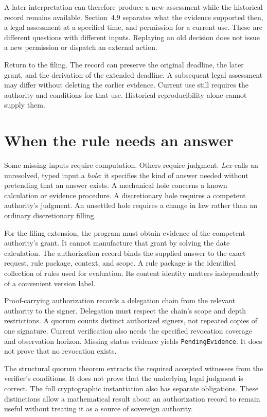 \documentclass{momentum}
\begin{document}
A later interpretation can therefore produce a new assessment while the historical record remains available. Section~4.9 separates what the evidence supported then, a legal assessment at a specified time, and permission for a current use. These are different questions with different inputs. Replaying an old decision does not issue a new permission or dispatch an external action.

Return to the filing. The record can preserve the original deadline, the later grant, and the derivation of the extended deadline. A subsequent legal assessment may differ without deleting the earlier evidence. Current use still requires the authority and conditions for that use. Historical reproducibility alone cannot supply them. \cite[Sections~3.3, 4.9, and~7.7]{lex}

\section{When the rule needs an answer}

Some missing inputs require computation. Others require judgment. \emph{Lex} calls an unresolved, typed input a \emph{hole}: it specifies the kind of answer needed without pretending that an answer exists. A mechanical hole concerns a known calculation or evidence procedure. A discretionary hole requires a competent authority's judgment. An unsettled hole requires a change in law rather than an ordinary discretionary filling. \cite[Section~3.5]{lex}

For the filing extension, the program must obtain evidence of the competent authority's grant. It cannot manufacture that grant by solving the date calculation. The authorization record binds the supplied answer to the exact request, rule package, context, and scope. A rule package is the identified collection of rules used for evaluation. Its content identity matters independently of a convenient version label. \cite[Sections~3.3, 4.7, and~7.7]{lex}

Proof-carrying authorization records a delegation chain from the relevant authority to the signer. Delegation must respect the chain's scope and depth restrictions. A quorum counts distinct authorized signers, not repeated copies of one signature. Current verification also needs the specified revocation coverage and observation horizon. Missing status evidence yields \texttt{PendingEvidence}. It does not prove that no revocation exists. \cite[Sections~3.5 and~4.7--4.9]{lex}

The structural quorum theorem extracts the required accepted witnesses from the verifier's conditions. It does not prove that the underlying legal judgment is correct. The full cryptographic instantiation also has separate obligations. These distinctions allow a mathematical result about an authorization record to remain useful without treating it as a source of sovereign authority. \cite[Section~3.5, quorum acceptance unfolding]{lex}
\end{document}
